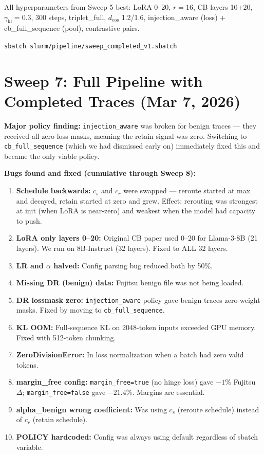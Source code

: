\documentclass[11pt]{article}
\begin{document}
All hyperparameters from Sweep 5 best:
LoRA 0--20, $r=16$, CB layers 10+20, $\gamma_\mathrm{kl}=0.3$,
300 steps, triplet\_full, $d_\mathrm{cos}$ 1.2/1.6,
injection\_aware (loss) + cb\_full\_sequence (pool), contrastive pairs.

\texttt{sbatch slurm/pipeline/sweep\_completed\_v1.sbatch}

\section{Sweep 7: Full Pipeline with Completed Traces (Mar 7, 2026)}

\textbf{Major policy finding:} \texttt{injection\_aware} was broken for benign
traces --- they received all-zero loss masks, meaning the retain signal was zero.
Switching to \texttt{cb\_full\_sequence} (which we had dismissed early on)
immediately fixed this and became the only viable policy.

\textbf{Bugs found and fixed (cumulative through Sweep 8):}
\begin{enumerate}
  \item \textbf{Schedule backwards:} $c_s$ and $c_r$ were swapped --- reroute
        started at max and decayed, retain started at zero and grew.
        Effect: rerouting was strongest at init (when LoRA is near-zero) and
        weakest when the model had capacity to push.
  \item \textbf{LoRA only layers 0--20:} Original CB paper used 0--20 for
        Llama-3-8B (21 layers). We run on 8B-Instruct (32 layers). Fixed to
        ALL 32 layers.
  \item \textbf{LR and $\alpha$ halved:} Config parsing bug reduced both by 50\%.
  \item \textbf{Missing DR (benign) data:} Fujitsu benign file was not being loaded.
  \item \textbf{DR lossmask zero:} \texttt{injection\_aware} policy gave benign
        traces zero-weight masks. Fixed by moving to \texttt{cb\_full\_sequence}.
  \item \textbf{KL OOM:} Full-sequence KL on 2048-token inputs exceeded GPU memory.
        Fixed with 512-token chunking.
  \item \textbf{ZeroDivisionError:} In loss normalization when a batch had zero
        valid tokens.
  \item \textbf{margin\_free config:} \texttt{margin\_free=true} (no hinge loss)
        gave $-1\%$ Fujitsu $\Delta$; \texttt{margin\_free=false} gave
        $-21.4\%$. Margins are essential.
  \item \textbf{alpha\_benign wrong coefficient:} Was using $c_s$ (reroute schedule)
        instead of $c_r$ (retain schedule).
  \item \textbf{POLICY hardcoded:} Config was always using default regardless
        of sbatch variable.
\end{enumerate}
\end{document}
